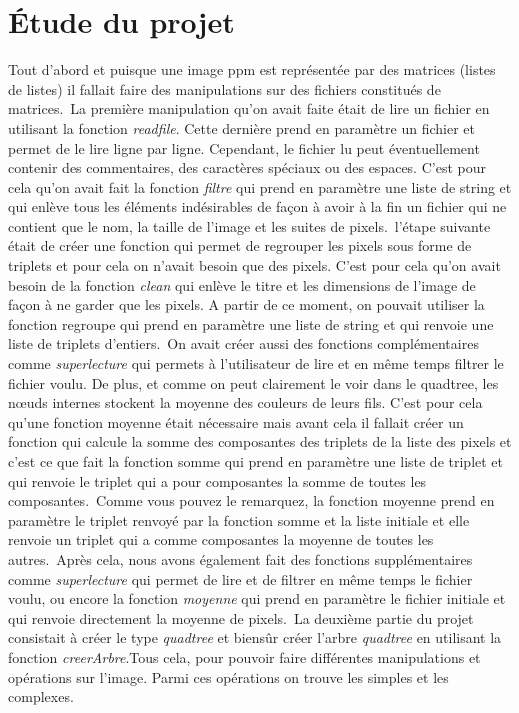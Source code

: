 \documentclass[12pt]{article}
\begin{document}
\section{Étude du projet}
Tout d'abord et puisque une image ppm est représentée par des matrices (listes de listes) il fallait faire des manipulations sur des fichiers constitués de matrices.\
La première manipulation qu'on avait faite était de lire un fichier en utilisant la fonction \textit{readfile}. Cette dernière prend en paramètre un fichier et permet de le lire ligne par ligne. Cependant, le fichier lu peut éventuellement contenir des commentaires, des caractères spéciaux ou des espaces. C'est pour cela qu'on avait fait la fonction \textit{filtre} qui prend en paramètre une liste de string et qui enlève tous les éléments indésirables de façon à avoir à la fin un fichier qui ne contient que le nom, la taille de l'image et les suites de pixels.\
l'étape suivante était de créer une fonction qui permet de regrouper les pixels sous forme de triplets et pour cela on n'avait besoin que des pixels. C'est pour cela qu'on avait besoin de la fonction 
\textit{clean} qui enlève le titre et les dimensions de l'image de façon à ne garder que les pixels. A partir de ce moment, on pouvait utiliser la fonction regroupe qui prend en paramètre une liste de string et qui renvoie une liste de triplets d'entiers.\
On avait créer aussi des fonctions complémentaires comme \textit{superlecture} qui permets à l'utilisateur de lire et en même temps filtrer le fichier voulu. De plus, et comme on peut clairement le voir dans le quadtree, les nœuds internes stockent la moyenne des couleurs de leurs fils. C'est pour cela qu'une fonction moyenne était nécessaire mais avant cela il fallait créer un fonction qui calcule la somme des composantes des triplets de la liste des pixels et c'est ce que fait la fonction somme qui prend en paramètre une liste de triplet et qui renvoie le triplet
qui a pour composantes la somme de toutes les composantes.\
Comme vous pouvez le remarquez, la fonction moyenne prend en paramètre le triplet renvoyé par la fonction somme et la liste initiale et elle renvoie un triplet qui a comme composantes la moyenne de toutes les autres.\
Après cela, nous avons également fait des fonctions supplémentaires comme \textit{superlecture} qui permet de lire et de filtrer en même temps le fichier voulu, ou encore la fonction \textit{moyenne}
qui prend en paramètre le fichier initiale et qui renvoie directement la moyenne de pixels.\
La deuxième partie du projet consistait à créer le type \textit{quadtree} et biensûr créer l'arbre \textit{quadtree} en utilisant la fonction \textit{creerArbre}.Tous cela, pour pouvoir 
faire différentes manipulations et opérations sur l'image. Parmi ces opérations on trouve les simples et les complexes. \\
\end{document}
